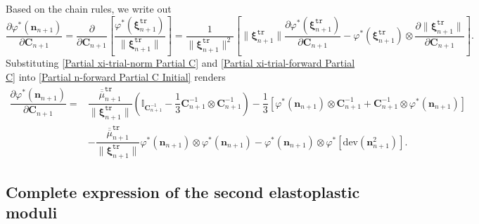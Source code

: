 \documentclass[preprint,11pt]{elsarticle}
\theoremstyle{definition}
\begin{document}
Based on the chain rules, we write out
\begin{equation} \label{Partial n-forward Partial C Initial}
    \dfrac{\partial \varphi^*(\mathbf{n}_{n+1})}{\partial \mathbf{C}_{n+1}} = \dfrac{\partial}{\partial \mathbf{C}_{n+1}} \left[ \dfrac{\varphi^* (\boldsymbol{\xi}_{n+1}^\texttt{tr})}{\lVert \boldsymbol{\xi}_{n+1}^\texttt{tr} \rVert} \right]
    = \dfrac{1}{\lVert \boldsymbol{\xi}_{n+1}^\texttt{tr} \rVert^2}
    \left[ \lVert \boldsymbol{\xi}_{n+1}^\texttt{tr} \rVert \dfrac{\partial \varphi^* (\boldsymbol{\xi}_{n+1}^\texttt{tr})}{\partial \mathbf{C}_{n+1}}
    - \varphi^*(\boldsymbol{\xi}_{n+1}^\texttt{tr}) \otimes \dfrac{\partial \lVert \boldsymbol{\xi}_{n+1}^\texttt{tr} \rVert}{\partial \mathbf{C}_{n+1}} \right].
\end{equation}
Substituting \eqref{Partial xi-trial-norm Partial C} and \eqref{Partial xi-trial-forward Partial C} into \eqref{Partial n-forward Partial C Initial} renders
\begin{equation} \label{Partial n-forward Partial C Final}
    \begin{array}{ll}
        \dfrac{\partial \varphi^*(\mathbf{n}_{n+1})}{\partial \mathbf{C}_{n+1}}
        = &\dfrac{\overline{\overline{\mu}}_{n+1}^\texttt{tr}}{\lVert \boldsymbol{\xi}_{n+1}^\texttt{tr} \rVert}
        \left( \mathbb{I}_{\mathbf{C}_{n+1}^{-1}} - \dfrac{1}{3} \mathbf{C}_{n+1}^{-1} \otimes \mathbf{C}_{n+1}^{-1} \right) - \dfrac{1}{3} \left[ \varphi^* \left( \mathbf{n}_{n+1} \right) \otimes \mathbf{C}_{n+1}^{-1}
        + \mathbf{C}_{n+1}^{-1} \otimes \varphi^* \left( \mathbf{n}_{n+1} \right) \right] \\[12pt]
        
        &- \dfrac{\overline{\overline{\mu}}_{n+1}^\texttt{tr}}{\lVert \boldsymbol{\xi}_{n+1}^\texttt{tr} \rVert}
        \varphi^*(\mathbf{n}_{n+1}) \otimes
        \varphi^*(\mathbf{n}_{n+1})
        - \varphi^*(\mathbf{n}_{n+1}) \otimes \varphi^*\left[ \text{dev} (\mathbf{n}_{n+1}^2) \right].
    \end{array}
\end{equation}

\subsection[]{Complete expression of the second elastoplastic moduli}
\end{document}
